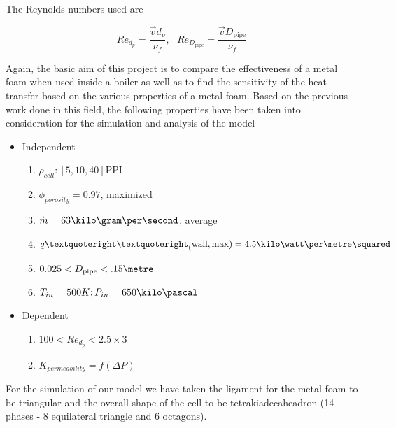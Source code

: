 \documentclass[compileTAMUreport.tex]{subfiles}
\begin{document}
The Reynolds numbers used are

\begin{equation}
Re_{d_{p}} = \frac{\vec{v} d_p}{\nu_f}, ~~~ Re_{D_{\mathrm{pipe}}} = \frac{\vec{v} D_{\mathrm{pipe}}}{\nu_f}
\end{equation}

Again, the basic aim of this project is to compare the effectiveness of a metal foam when used inside a boiler as well as to find the sensitivity of the heat transfer based on the various properties of a metal foam. Based on the previous work done in this field, the following properties have been taken into consideration for the simulation and analysis of the model


\begin{itemize}
	\item Independent
		\begin{enumerate}
			\item $\rho_{cell} : [5,10,40] \mathrm{PPI}$
			\item $\phi_{porosity}= 0.97$, maximized
			\item $\dot{m} =63 \kilo\gram\per\second$, average
			\item $ q’’_(\mathrm{wall,max})=4.5 \kilo\watt\per\metre\squared$
			\item $ 0.025 < D_{\mathrm{pipe}} < .15 \metre$
			\item $ T_{in}=500K;P_{in} = 650 \kilo\pascal $
		\end{enumerate}
	\item Dependent
		\begin{enumerate}
			\item $100 < Re_{d_p} < 2.5 \times 3$
			\item $K_{permeability}= f(\Delta P)$
		\end{enumerate}
\end{itemize}

For the simulation of our model we have taken the ligament for the metal foam to be triangular and the overall shape of the cell to be tetrakiadecaheadron (14 phases - 8 equilateral triangle and 6 octagons).
\end{document}
